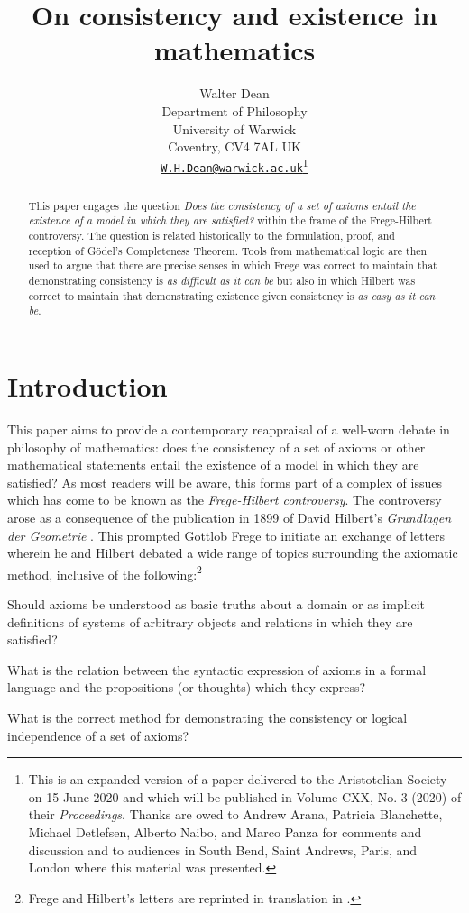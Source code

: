 \documentclass[11pt,fleqn,leqno]{article}
\title{On consistency and existence in mathematics}
\author{Walter Dean\\
\footnotesize{Department of Philosophy}\\
\footnotesize{University of Warwick}\\
\footnotesize{Coventry, CV4 7AL UK}\\
\footnotesize{\href{maitlto:W.H.Dean@warwick.ac.uk}{\texttt{W.H.Dean@warwick.ac.uk}}}\thanks{This is an expanded version of a paper delivered to the Aristotelian Society on 15 June 2020 and which will be published in Volume CXX, No. 3 (2020) of their \textsl{Proceedings}.  Thanks are owed to Andrew Arana, Patricia Blanchette, Michael Detlefsen, Alberto Naibo, and Marco Panza for comments and discussion and to audiences in South Bend, Saint Andrews, Paris, and London where this material was presented.}}
\date{}
\begin{document}
\maketitle


\begin{abstract}
\noindent This paper engages the question \textsl{Does the consistency of a set of axioms entail the existence of a model in which they are satisfied?} within the frame of the Frege-Hilbert controversy.   The question is related historically to the formulation, proof, and reception of G\"odel's Completeness Theorem.   Tools from mathematical logic are then used to argue that there are precise senses in which Frege was correct to maintain that demonstrating consistency is \textsl{as difficult as it can be} but also in which Hilbert was correct to maintain that demonstrating existence given consistency is \textsl{as easy as it can be}.
\end{abstract}
\section{Introduction}

This paper aims to provide a contemporary reappraisal of a well-worn debate in philosophy of mathematics: does the consistency of a set of  axioms or other mathematical statements entail the existence of a model in which they are satisfied?  As most readers will be aware, this forms part of a complex of issues which has come to be known as the \textsl{Frege-Hilbert controversy}.  The controversy arose as a consequence of the publication in 1899 of  David Hilbert's \textsl{Grundlagen der Geometrie} \citeyearpar{Hilbert1899}.  This prompted Gottlob Frege to initiate an exchange of letters  wherein he and Hilbert debated a wide range of topics surrounding the axiomatic method, inclusive of the following:\footnote{Frege and Hilbert's letters are reprinted in translation in \citep{Frege1980a}.}
\begin{example}
\label{initques}
\begin{compactenum}[i)]
\item Should axioms be understood as basic truths about a domain or as implicit definitions of systems of arbitrary objects and relations in which they are satisfied?
\item What is the relation between the syntactic expression of axioms in a formal language and the propositions (or thoughts) which they express?
\item What is the correct method for demonstrating the consistency or logical independence of a set of axioms?
\end{compactenum}
\end{example}
\end{document}
